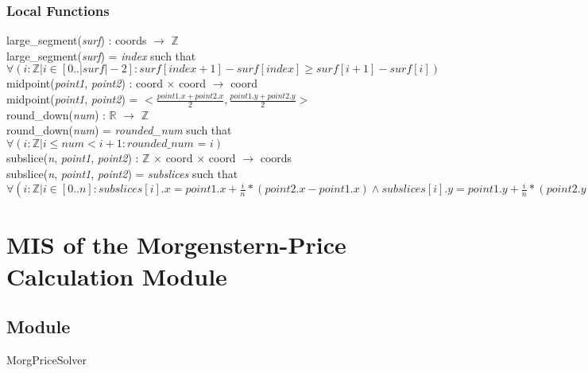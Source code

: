 \documentclass[12pt, titlepage]{article}
\begin{document}
\subsubsection{Local Functions}
large\_segment(\textit{surf}) : coords $\rightarrow$ $\mathbb{Z}$\\
large\_segment(\textit{surf}) = \textit{index} such that\\
$\forall(i : \mathbb{Z} | i \in [0..|\textit{surf}|-2] : 
\textit{surf}[\textit{index}+1] - \textit{surf}[\textit{index}] \geq 
\textit{surf}[i+1] - \textit{surf}[i])$\\

\noindent midpoint(\textit{point1}, \textit{point2}) : coord $\times$ coord 
$\rightarrow$ coord\\
midpoint(\textit{point1}, \textit{point2}) = $< \frac{point1.x + point2.x}{2}, 
\frac{point1.y + point2.y}{2} >$\\

\noindent round\_down(\textit{num}) : $\mathbb{R}$ $\rightarrow$ $\mathbb{Z}$\\
round\_down(\textit{num}) = \textit{rounded\_num} such that\\
$\forall(i : \mathbb{Z} | i \leq \textit{num} < i + 1 : \textit{rounded\_num = 
i})$\\

\noindent subslice(\textit{n}, \textit{point1}, \textit{point2}) : $\mathbb{Z}$ 
$\times$ coord $\times$ coord $\rightarrow$ coords\\
subslice(\textit{n}, \textit{point1}, \textit{point2}) = \textit{subslices} 
such that\\
$\forall(i : \mathbb{Z} | i \in [0..n] : subslices[i].x = point1.x + 
\frac{i}{n}*(point2.x - point1.x) \land subslices[i].y = point1.y + 
\frac{i}{n}*(point2.y - point1.y))$\\


\section{MIS of the Morgenstern-Price Calculation Module} \label{sec:MPMod}

\subsection{Module}
MorgPriceSolver
\end{document}

